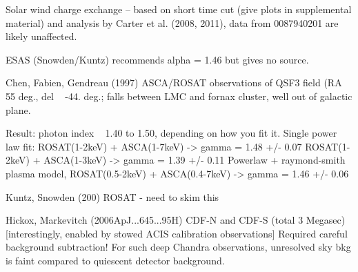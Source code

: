 
Solar wind charge exchange -- based on short time cut (give plots in
supplemental material) and analysis by Carter et al. (2008, 2011),
data from 0087940201 are likely unaffected.


ESAS (Snowden/Kuntz) recommends alpha = 1.46 but gives no source.

Chen, Fabien, Gendreau (1997)
  ASCA/ROSAT observations of QSF3 field (RA ~ 55 deg., del ~ -44. deg.; falls
  between LMC and fornax cluster, well out of galactic plane.

  Result: photon index ~ 1.40 to 1.50, depending on how you fit it.
  Single power law fit:
    ROSAT(1-2keV) + ASCA(1-7keV) -> gamma = 1.48 +/- 0.07
    ROSAT(1-2keV) + ASCA(1-3keV) -> gamma = 1.39 +/- 0.11
  Powerlaw + raymond-smith plasma model,
    ROSAT(0.5-2keV) + ASCA(0.4-7keV) -> gamma = 1.46 +/- 0.06

Kuntz, Snowden (200)
    ROSAT - need to skim this

Hickox, Markevitch (2006ApJ...645...95H)
    CDF-N and CDF-S (total 3 Megasec)
    [interestingly, enabled by stowed ACIS calibration observations]
    Required careful background subtraction!
      For such deep Chandra observations, unresolved sky bkg is faint compared
      to quiescent detector background.



